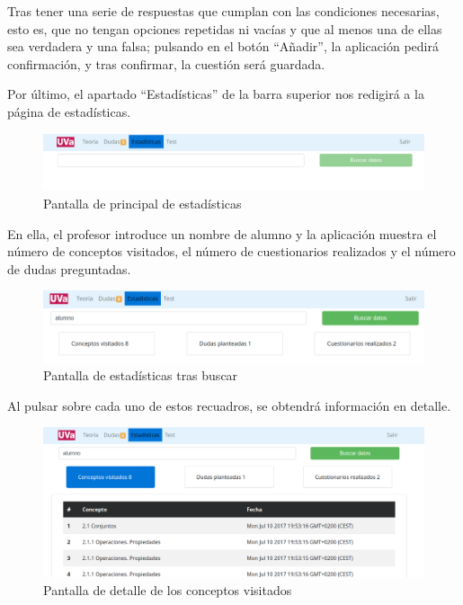 \documentclass[openright,twoside,10pt]{book}
\begin{document}
    Tras tener una serie de respuestas que cumplan con las condiciones
    necesarias, esto es, que no tengan opciones repetidas ni vacías y que al
    menos una de ellas sea verdadera y una falsa; pulsando en el botón
    \enquote{Añadir}, la aplicación pedirá confirmación, y tras confirmar,
    la cuestión será guardada.
    
    Por último, el apartado \enquote{Estadísticas} de la barra superior nos
    redigirá a la página de estadísticas.
    
    \begin{figure}[H]
        \begin{center}
            \includegraphics[width=\textwidth]{img/manual/profesor-estadisticas.png}
        \end{center}
        \caption{Pantalla de principal de estadísticas}
    \end{figure}
    
    En ella, el profesor introduce un nombre de alumno y la aplicación
    muestra el número de conceptos visitados, el número de cuestionarios
    realizados y el número de dudas preguntadas.
    
    \begin{figure}[H]
        \begin{center}
            \includegraphics[width=\textwidth]{img/manual/profesor-estadisticas2.png}
        \end{center}
        \caption{Pantalla de estadísticas tras buscar}
    \end{figure}
    
    Al pulsar sobre cada uno de estos recuadros, se obtendrá información en
    detalle.
    
    \begin{figure}[H]
        \begin{center}
            \includegraphics[width=\textwidth]{img/manual/profesor-estadisticas-detalle1.png}
        \end{center}
        \caption{Pantalla de detalle de los conceptos visitados}
    \end{figure}
    
\end{document}
